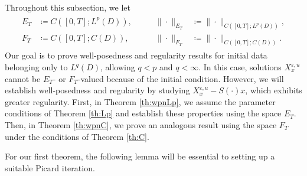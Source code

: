 \documentclass[10pt,a4paper]{amsart}
\numberwithin{equation}{section}
\newcommand{\ceqq}{\coloneqq}
\newcommand{\eps}{\varepsilon}
\begin{document}
Throughout this subsection, we let 
\begin{align}\label{eq:defE_TF_T}
\begin{alignedat}{2}
E_T &\ceqq C([0,T];L^p(D)), 
&\qquad \|\cdot\|_{E_T} &\ceqq \|\cdot\|_{C([0,T];L^p(D))},\\
F_T &\ceqq C([0,T];C(D)),
&\qquad \|\cdot\|_{F_T} &\ceqq \|\cdot\|_{C([0,T];C(D))}.
\end{alignedat}
\end{align}
Our goal is to prove well-posedness and regularity results for initial data belonging only to $L^q(D)$, allowing $q<p$ and $q<\infty$. In this case, solutions $X_x^{\eps,u}$ cannot be $E_T$- or $F_T$-valued because of the initial condition. 
However, we will establish well-posedness and regularity by studying $X_x^{\eps,u}-S(\cdot)x$, which exhibits greater regularity.
First, in Theorem \ref{th:wpnLp}, we assume the parameter conditions of Theorem \ref{th:Lp} and establish these properties using the space $E_T$. Then, in Theorem \ref{th:wpnC}, we prove an analogous result using the space $F_T$ under the conditions of Theorem \ref{th:C}. 

For our first theorem, the following lemma will be essential to setting up a suitable Picard iteration. 
  
\end{document}
